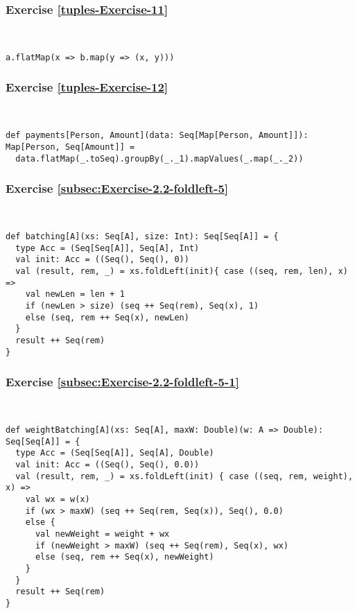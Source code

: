 \subsubsection*{Exercise \ref{tuples-Exercise-11}}

~
\begin{lstlisting}
a.flatMap(x => b.map(y => (x, y)))
\end{lstlisting}


\subsubsection*{Exercise \ref{tuples-Exercise-12}}

~
\begin{lstlisting}
def payments[Person, Amount](data: Seq[Map[Person, Amount]]): Map[Person, Seq[Amount]] =
  data.flatMap(_.toSeq).groupBy(_._1).mapValues(_.map(_._2))
\end{lstlisting}


\subsubsection*{Exercise \ref{subsec:Exercise-2.2-foldleft-5}}

~
\begin{lstlisting}
def batching[A](xs: Seq[A], size: Int): Seq[Seq[A]] = {  
  type Acc = (Seq[Seq[A]], Seq[A], Int)
  val init: Acc = ((Seq(), Seq(), 0))
  val (result, rem, _) = xs.foldLeft(init){ case ((seq, rem, len), x) =>
    val newLen = len + 1
    if (newLen > size) (seq ++ Seq(rem), Seq(x), 1)
    else (seq, rem ++ Seq(x), newLen)
  }
  result ++ Seq(rem)
}
\end{lstlisting}


\subsubsection*{Exercise \ref{subsec:Exercise-2.2-foldleft-5-1}}

~
\begin{lstlisting}
def weightBatching[A](xs: Seq[A], maxW: Double)(w: A => Double): Seq[Seq[A]] = {  
  type Acc = (Seq[Seq[A]], Seq[A], Double)
  val init: Acc = ((Seq(), Seq(), 0.0))
  val (result, rem, _) = xs.foldLeft(init) { case ((seq, rem, weight), x) =>
    val wx = w(x)
    if (wx > maxW) (seq ++ Seq(rem, Seq(x)), Seq(), 0.0)
    else {
      val newWeight = weight + wx
      if (newWeight > maxW) (seq ++ Seq(rem), Seq(x), wx)
      else (seq, rem ++ Seq(x), newWeight)
    }
  }
  result ++ Seq(rem)
}
\end{lstlisting}


